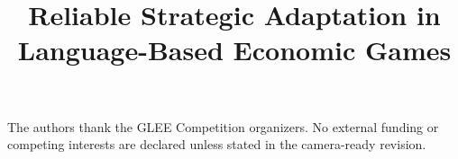 \documentclass{article}
\title{Reliable Strategic Adaptation in Language-Based Economic Games}
\author{\PaperAuthors}
\begin{document}
\maketitle









\begin{ack}
The authors thank the GLEE Competition organizers. No external funding or
competing interests are declared unless stated in the camera-ready revision.
\end{ack}




\appendix



\newpage

\end{document}
